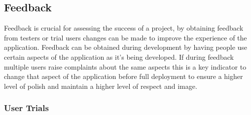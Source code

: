 \subsection{Feedback}\label{feedback}

Feedback is crucial for assessing the success of a project, by obtaining
feedback from testers or trial users changes can be made to improve the
experience of the application. Feedback can be obtained during
development by having people use certain aspects of the application as
it's being developed. If during feedback multiple users raise complaints
about the same aspects this is a key indicator to change that aspect of
the application before full deployment to ensure a higher level of
polish and maintain a higher level of respect and image.

\subsubsection{User Trials}\label{user-trials}
